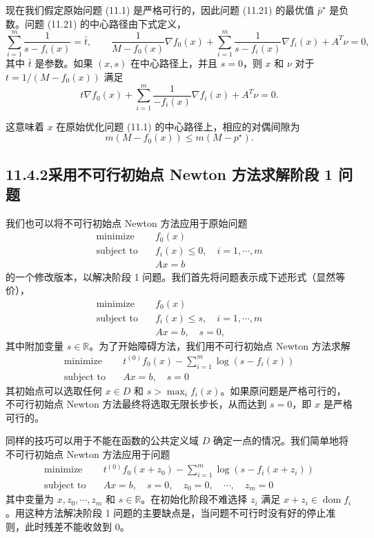\documentclass[UTF8,12pt,a4paper,fontset=fandol]{ctexart}
\begin{document}
现在我们假定原始问题 (11.1) 是严格可行的，因此问题 (11.21) 的最优值 $\bar{p}^\star$ 是负数。问题 (11.21) 的中心路径由下式定义，
\[
\sum_{i=1}^m\frac{1}{s-f_i(x)}=\bar{t},\qquad
\frac{1}{M-f_0(x)}\nabla f_0(x)+\sum_{i=1}^m\frac{1}{s-f_i(x)}\nabla f_i(x)+A^T\nu=0,
\]
其中 $\bar{t}$ 是参数。如果 $(x,s)$ 在中心路径上，并且 $s=0$，则 $x$ 和 $\nu$ 对于 $t=1/(M-f_0(x))$ 满足
\[
t\nabla f_0(x)+\sum_{i=1}^m\frac{1}{-f_i(x)}\nabla f_i(x)+A^T\nu=0.
\]

这意味着 $x$ 在原始优化问题 (11.1) 的中心路径上，相应的对偶间隙为
\begin{equation}
m(M-f_0(x))\leq m(M-p^\star).
\tag{11.22}
\end{equation}

\subsection*{11.4.2\quad 采用不可行初始点 Newton 方法求解阶段 1 问题}

我们也可以将不可行初始点 Newton 方法应用于原始问题
\[
\begin{aligned}
\text{minimize}\quad & f_0(x)\\
\text{subject to}\quad & f_i(x)\leq 0,\quad i=1,\cdots,m\\
& Ax=b
\end{aligned}
\]
的一个修改版本，以解决阶段 1 问题。我们首先将问题表示成下述形式（显然等价），
\[
\begin{aligned}
\text{minimize}\quad & f_0(x)\\
\text{subject to}\quad & f_i(x)\leq s,\quad i=1,\cdots,m\\
& Ax=b,\quad s=0,
\end{aligned}
\]
其中附加变量 $s\in\mathbb{R}$。为了开始障碍方法，我们用不可行初始点 Newton 方法求解
\[
\begin{aligned}
\text{minimize}\quad & t^{(0)}f_0(x)-\sum_{i=1}^m\log(s-f_i(x))\\
\text{subject to}\quad & Ax=b,\quad s=0
\end{aligned}
\]
其初始点可以选取任何 $x\in D$ 和 $s>\max_i f_i(x)$。如果原问题是严格可行的，不可行初始点 Newton 方法最终将选取无限长步长，从而达到 $s=0$，即 $x$ 是严格可行的。

同样的技巧可以用于不能在函数的公共定义域 $D$ 确定一点的情况。我们简单地将不可行初始点 Newton 方法应用于问题
\[
\begin{aligned}
\text{minimize}\quad & t^{(0)}f_0(x+z_0)-\sum_{i=1}^m\log(s-f_i(x+z_i))\\
\text{subject to}\quad & Ax=b,\quad s=0,\quad z_0=0,\quad \cdots,\quad z_m=0
\end{aligned}
\]
其中变量为 $x,z_0,\cdots,z_m$ 和 $s\in\mathbb{R}$。在初始化阶段不难选择 $z_i$ 满足 $x+z_i\in\operatorname{dom} f_i$。用这种方法解决阶段 1 问题的主要缺点是，当问题不可行时没有好的停止准则，此时残差不能收敛到 0。
\end{document}
